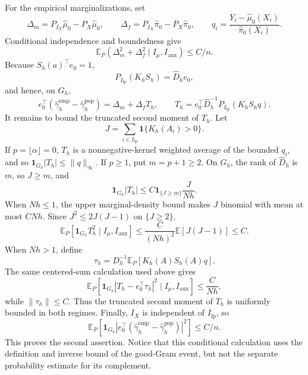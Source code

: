 For the empirical marginalizations, set
\[
\Delta_m=P_{I_X}\widehat\mu_0-P_X\widehat\mu_0,
\qquad
\Delta_f=P_{I_X}\widehat\pi_0-P_X\widehat\pi_0,
\qquad
q_i=\frac{Y_i-\widehat\mu_0(X_i)}{\widehat\pi_0(X_i)}.
\]
Conditional independence and boundedness give
\[
\mathbb E_P(\Delta_m^2+\Delta_f^2\mid I_\mu,I_{\mathrm{aux}})\le C/n.
\]
Because \(S_h(a)^\top e_0=1\),
\[
P_{I_{\mathrm{lp}}}(K_hS_h)=\widehat D_he_0,
\]
and hence, on \(G_h\),
\[
e_0^\top(\widehat\gamma_h^{\mathrm{emp}}-\widehat\gamma_h^{\mathrm{pop}})
=
\Delta_m+\Delta_fT_h,
\qquad
T_h=e_0^\top\widehat D_h^{-1}P_{I_{\mathrm{lp}}}(K_hS_hq).
\]
It remains to bound the truncated second moment of \(T_h\). Let
\[
J=\sum_{i\in I_{\mathrm{lp}}}\mathbf1\{K_h(A_i)>0\}.
\]
If \(p=\lfloor\alpha\rfloor=0\), \(T_h\) is a nonnegative-kernel weighted average of the bounded \(q_i\), and so \(\mathbf1_{G_h}|T_h|\le\|q\|_\infty\). If \(p\ge1\), put \(m=p+1\ge2\). On \(G_h\), the rank of \(\widehat D_h\) is \(m\), so \(J\ge m\), and
\[
\mathbf1_{G_h}|T_h|
\le C\mathbf1_{\{J\ge m\}}\frac{J}{Nh}.
\]
When \(Nh\le1\), the upper marginal-density bound makes \(J\) binomial with mean at most \(CNh\). Since \(J^2\le2J(J-1)\) on \(\{J\ge2\}\),
\[
\mathbb E_P[\mathbf1_{G_h}T_h^2\mid I_\mu,I_{\mathrm{aux}}]
\le\frac{C}{(Nh)^2}\mathbb E[J(J-1)]\le C.
\]
When \(Nh>1\), define
\[
\tau_h=D_h^{-1}\mathbb E_P[K_h(A)S_h(A)q].
\]
The same centered-sum calculation used above gives
\[
\mathbb E_P[\mathbf1_{G_h}|T_h-e_0^\top\tau_h|^2\mid I_\mu,I_{\mathrm{aux}}]
\le\frac{C}{Nh},
\]
while \(\|\tau_h\|\le C\). Thus the truncated second moment of \(T_h\) is uniformly bounded in both regimes. Finally, \(I_X\) is independent of \(I_{\mathrm{lp}}\), so
\[
\mathbb E_P[\mathbf1_{G_h}|e_0^\top(\widehat\gamma_h^{\mathrm{emp}}-
\widehat\gamma_h^{\mathrm{pop}})|^2]
\le C/n.
\]
This proves the second assertion. Notice that this conditional calculation uses the definition and inverse bound of the good-Gram event, but not the separate probability estimate for its complement.
